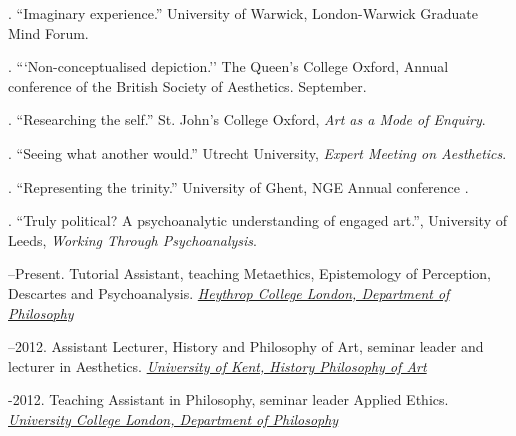 \documentclass[11pt]{article}
\begin{document}
. ``Imaginary experience.'' University of Warwick, London-Warwick Graduate Mind Forum.


. ```Non-conceptualised depiction.'' The Queen's College Oxford, Annual conference of the British Society of Aesthetics. September.

. ``Researching the self.'' St. John's College Oxford, \emph{Art as a Mode of Enquiry}.

. ``Seeing what another would.'' Utrecht University, \emph{Expert Meeting on Aesthetics}.

. ``Representing the trinity.'' University of Ghent, NGE Annual conference .

. ``Truly political? A psychoanalytic understanding of engaged art.'', University of Leeds, \emph{Working Through Psychoanalysis}.

% 

\bigskip
{}


--Present. Tutorial Assistant, teaching Metaethics, Epistemology of Perception, Descartes and Psychoanalysis. \href{http://www.heythrop.ac.uk/departments/academic-departments/philosophy/}{\emph{Heythrop College London, Department of  Philosophy} \vspace{0.01in}}

\medskip

--2012. Assistant Lecturer, History and Philosophy of Art, seminar leader and lecturer in Aesthetics. \href{http://www.kent.ac.uk/arts/hpa/index.html}{\emph{University of Kent, History \amper Philosophy of Art} \vspace{0.01in}}

\medskip

-2012. Teaching Assistant in Philosophy, seminar leader Applied Ethics. \href{http://www.ucl.ac.uk/philosophy/}{\emph{University College London, Department of  Philosophy}} \vspace{0.01in}
\end{document}
